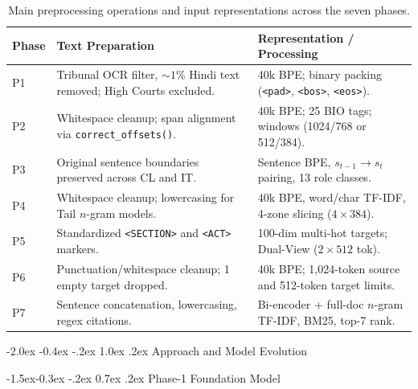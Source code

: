 \documentclass[11pt, oneside]{article}
\makeatletter
\renewcommand\section{\@startsection {section}{1}{\z@}%
  {-2.0ex \@plus -0.4ex \@minus -.2ex}%
  {1.0ex \@plus.2ex}%
  {\normalfont\Large\bfseries}}
\renewcommand\subsection{\@startsection{subsection}{2}{\z@}%
  {-1.5ex\@plus -0.3ex \@minus -.2ex}%
  {0.7ex \@plus .2ex}%
  {\normalfont\large\bfseries}}
\makeatother
\begin{document}
\begin{table}[t]
\centering
\scriptsize
\setlength{\tabcolsep}{2.5pt}
\renewcommand{\arraystretch}{0.84}
\caption{Main preprocessing operations and input representations across the seven phases.}
\label{tab:preprocessing_summary}
\begin{tabularx}{\textwidth}{@{}p{0.75cm}p{5.1cm}X@{}}
\toprule
\textbf{Phase} & \textbf{Text Preparation} & \textbf{Representation / Processing} \\
\midrule
P1 & Tribunal OCR filter, $\sim 1\%$ Hindi text removed; High Courts excluded. & 40k BPE; binary packing (\texttt{<pad>}, \texttt{<bos>}, \texttt{<eos>}). \\
P2 & Whitespace cleanup; span alignment via \texttt{correct\_offsets()}. & 40k BPE; 25 BIO tags; windows (1024/768 or 512/384). \\
P3 & Original sentence boundaries preserved across CL and IT. & Sentence BPE, $s_{t-1}\to s_t$ pairing, 13 role classes. \\
P4 & Whitespace cleanup; lowercasing for Tail $n$-gram models. & 40k BPE, word/char TF-IDF, 4-zone slicing ($4\times 384$). \\
P5 & Standardized \texttt{<SECTION>} and \texttt{<ACT>} markers. & 100-dim multi-hot targets; Dual-View ($2\times 512$ tok). \\
P6 & Punctuation/whitespace cleanup; 1 empty target dropped. & 40k BPE; 1,024-token source and 512-token target limits. \\
P7 & Sentence concatenation, lowercasing, regex citations. & Bi-encoder + full-doc $n$-gram TF-IDF, BM25, top-7 rank. \\
\bottomrule
\end{tabularx}
\end{table}

\section{Approach and Model Evolution}

\subsection{Phase-1 Foundation Model}
\end{document}
